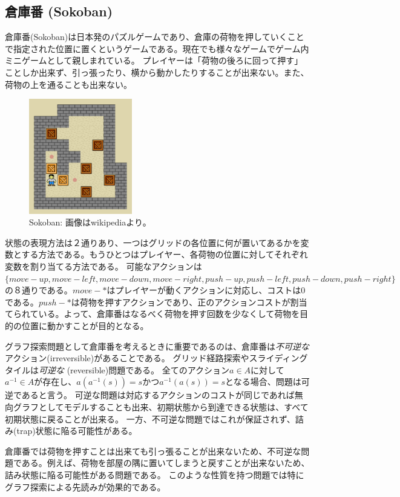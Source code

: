 \documentclass{report}
\begin{document}
\subsection{倉庫番 (Sokoban)}
倉庫番(Sokoban)は日本発のパズルゲームであり、倉庫の荷物を押していくことで指定された位置に置くというゲームである。現在でも様々なゲームでゲーム内ミニゲームとして親しまれている。
プレイヤーは「荷物の後ろに回って押す」ことしか出来ず、引っ張ったり、横から動かしたりすることが出来ない。また、荷物の上を通ることも出来ない。

\begin{figure}
\centering
\includegraphics[width=0.4\textwidth]{figures/sokoban.pdf}
\caption{Sokoban: 画像はwikipediaより。}
\label{fig:sokoban}
\end{figure}

状態の表現方法は２通りあり、一つはグリッドの各位置に何が置いてあるかを変数とする方法である。もうひとつはプレイヤー、各荷物の位置に対してそれぞれ変数を割り当てる方法である。
可能なアクションは$\{move-up,move-left,move-down,move-right,push-up,push-left,push-down,push-right\}$の８通りである。$move-*$はプレイヤーが動くアクションに対応し、コストは0である。$push-*$は荷物を押すアクションであり、正のアクションコストが割当てられている。よって、倉庫番はなるべく荷物を押す回数を少なくして荷物を目的の位置に動かすことが目的となる。

グラフ探索問題として倉庫番を考えるときに重要であるのは、倉庫番は{\it 不可逆な}アクション(irreversible)があることである。
グリッド経路探索やスライディングタイルは{\it 可逆な} (reversible)問題である。
全てのアクション$a \in A$に対して$a^{-1} \in A$が存在し、$a(a^{-1}(s)) = s$かつ$a^{-1}(a(s)) = s$となる場合、問題は可逆であると言う。
可逆な問題は対応するアクションのコストが同じであれば無向グラフとしてモデルすることも出来、初期状態から到達できる状態は、すべて初期状態に戻ることが出来る。
一方、不可逆な問題ではこれが保証されず、詰み(trap)状態に陥る可能性がある。

倉庫番では荷物を押すことは出来ても引っ張ることが出来ないため、不可逆な問題である。例えば、荷物を部屋の隅に置いてしまうと戻すことが出来ないため、詰み状態に陥る可能性がある問題である。
このような性質を持つ問題では特にグラフ探索による先読みが効果的である。
\end{document}
